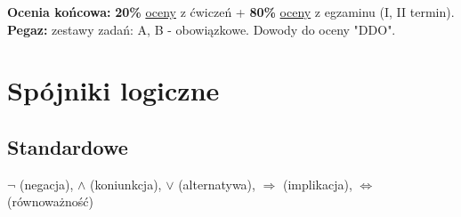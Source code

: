 \documentclass[a5paper,8pt]{article}
\begin{document}
        \textbf{Ocenia końcowa: } \textbf{20\%} \underline{oceny} z ćwiczeń + \textbf{80\%} \underline{oceny} z egzaminu (I, II termin).\\

        \textbf{Pegaz: } zestawy zadań: A, B - obowiązkowe. Dowody do oceny "DDO".


    \section{Spójniki logiczne} %
    \label{sec:spójniki_logiczne}

        \subsection{Standardowe} %
        \label{sub:standardowe}
            $\neg$ (negacja), $\wedge$ (koniunkcja), $\vee$ (alternatywa), $\Rightarrow$ (implikacja), $\Leftrightarrow$ (równoważność)
\end{document}
